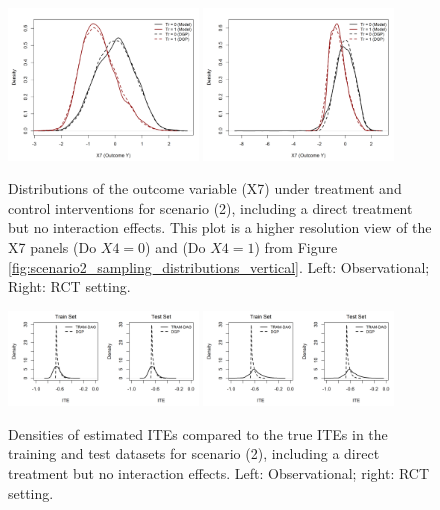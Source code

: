 \begin{figure}[htbp]
\centering
\includegraphics[width=0.45\textwidth]{img/results/observ_scenario2_X7_treatment_densities.png}
\includegraphics[width=0.45\textwidth]{img/results/rct_scenario2_X7_treatment_densities.png}
\caption{Distributions of the outcome variable (X7) under treatment and control interventions for scenario (2), including a direct treatment but no interaction effects. This plot is a higher resolution view of the X7 panels (Do $X4=0$) and (Do $X4=1$) from Figure \ref{fig:scenario2_sampling_distributions_vertical}. Left: Observational; Right: RCT setting.}
\label{fig:scenario2_outcome_distributions}
\end{figure}




\begin{figure}[htbp]
\centering
\includegraphics[width=0.45\textwidth]{img/results/observ_scenario2_ITE_densities_train_test.png}
\includegraphics[width=0.45\textwidth]{img/results/rct_scenario2_ITE_densities_train_test.png}
\caption{Densities of estimated ITEs compared to the true ITEs in the training and test datasets for scenario (2), including a direct treatment but no interaction effects. Left: Observational; right: RCT setting.}
\label{fig:scenario2_ite_densities_train_test}
\end{figure}






